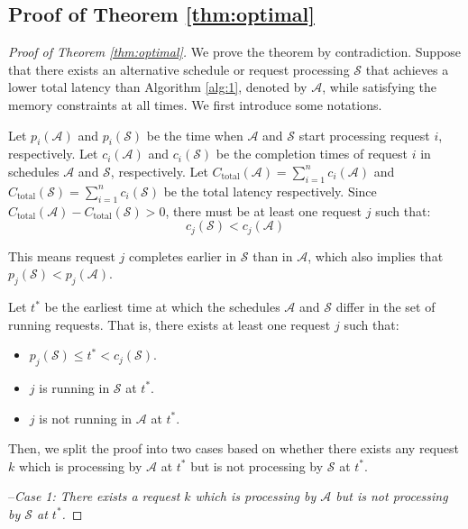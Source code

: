 \documentclass[11pt, a4paper]{article}
\theoremstyle{plain}
\theoremstyle{definition}
\theoremstyle{remark}
\begin{document}
\subsection{Proof of Theorem \ref{thm:optimal}}
\OptimalTheorem*
\begin{proof}[Proof of Theorem \ref{thm:optimal}]
We prove the theorem by contradiction. Suppose that there exists an alternative schedule or request processing $\mathcal{S}$ that achieves a lower total latency than Algorithm \ref{alg:1}, denoted by \( \mathcal{A} \), while satisfying the memory constraints at all times. We first introduce some notations.

Let \( p_i(\mathcal{A}) \) and \( p_i(\mathcal{S}) \) be the time when \( \mathcal{A} \) and \( \mathcal{S} \) start processing request \( i \), respectively.
Let \( c_i(\mathcal{A}) \) and \( c_i(\mathcal{S}) \) be the completion times of request \( i \) in schedules \( \mathcal{A} \) and \( \mathcal{S} \), respectively. Let \( C_{\text{total}}(\mathcal{A}) = \sum_{i=1}^{n} c_i(\mathcal{A}) \) and \( C_{\text{total}}(\mathcal{S}) = \sum_{i=1}^{n} c_i(\mathcal{S}) \) be the total latency respectively. Since \(C_{\text{total}}(\mathcal{A}) - C_{\text{total}}(\mathcal{S})>0 \), there must be at least one request \( j \) such that:
\[
c_j(\mathcal{S}) < c_j(\mathcal{A})
\]

This means request \( j \) completes earlier in \( \mathcal{S} \) than in \( \mathcal{A} \), which also implies that \(p_j(\mathcal{S}) < p_j(\mathcal{A})\).

Let \( t^* \) be the earliest time at which the schedules \( \mathcal{A} \) and \( \mathcal{S} \) differ in the set of running requests. That is, there exists at least one request \( j \) such that:
\begin{itemize}
    \item \( p_j(\mathcal{S}) \leq t^* < c_j(\mathcal{S}) \).
    \item \( j \) is running in \( \mathcal{S} \) at \( t^* \).
    \item \( j \) is not running in \( \mathcal{A} \) at \( t^* \).
\end{itemize}

Then, we split the proof into two cases based on whether there exists any request $k$ which is processing by \( \mathcal{A} \) at \( t^* \) but is not processing by \( \mathcal{S} \) at \( t^* \). 



--\textit{Case 1: There exists a request $k$ which is processing by \( \mathcal{A} \) but is not processing by \( \mathcal{S} \) at \( t^* \).}


\end{proof}
\end{document}
